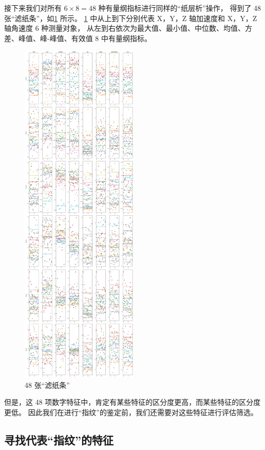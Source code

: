 \documentclass[withoutpreface]{cumcmthesis}
\begin{document}
接下来我们对所有 $6 \times 8 = 48$ 种有量纲指标进行同样的“纸层析”操作，
得到了 48 张“滤纸条”，如\cref{fig:48条滤纸} 所示。
\cref{fig:48条滤纸} 中从上到下分别代表 X，Y，Z 轴加速度和 X，Y，Z 轴角速度 6 种测量对象，
从左到右依次为最大值、最小值、中位数、均值、方差、峰值、峰-峰值、有效值 8 中有量纲指标。

\begin{figure}[!htbp]
    \centering
    \includegraphics[width=0.5\textwidth]{figures/48条滤纸.jpg}
    \caption{48 张“滤纸条”}
    \label{fig:48条滤纸}
\end{figure}

但是，这 48 项数字特征中，肯定有某些特征的区分度更高，而某些特征的区分度更低。
因此我们在进行“指纹”的鉴定前，我们还需要对这些特征进行评估筛选。

\subsection{寻找代表“指纹”的特征}
\end{document}

